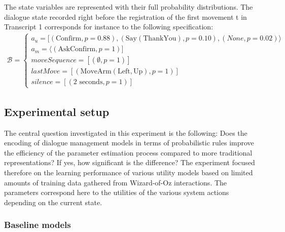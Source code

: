 The state variables are represented with their full probability distributions. The dialogue state recorded right before the registration of the first movement t in Transcript 1 corresponds for instance to the following specification: 
\begin{align*}
\mathcal{B} = \begin{cases} a_u = [ (\mathrm{Confirm}, p\!=\!0.88), (\mathrm{Say(ThankYou)}, p\!=\!0.10), (\mathit{None}, p\!=\!0.02) \rangle \\
a_m = \langle (\mathrm{AskConfirm}, p\!=\!1) ] \\
\mathit{moveSequence} = [ ( \emptyset, p\!=\!1) ] \\
\mathit{lastMove} = [ (\mathrm{MoveArm(Left,Up)}, p\!=\!1) ] \\
\mathit{silence} = [ (2 \textrm{ seconds}, p\!=\!1) ] \end{cases}
\end{align*}

\subsection{Experimental setup}
\label{sec:wozlearning-experiments-setup}

The central question investigated in this experiment is the following: Does the encoding of dialogue management models in terms of probabilistic rules improve the efficiency of the parameter estimation process compared to more traditional representations? If yes, how significant is the difference? The experiment focused therefore on the learning performance of various utility models based on limited amounts of training data gathered from Wizard-of-Oz interactions. The parameters correspond here to the utilities of the various system actions depending on the current state.

\subsubsection*{Baseline models}

